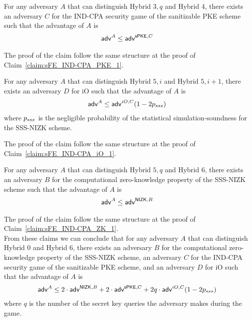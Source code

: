 \documentclass{llncs}
\begin{document}
\begin{claim} \label{claim:sFE_IND-CPA_PKE_2}
For any adversary $A$ that can distinguish Hybrid $3,q$ and Hybrid 4, there exists an adversary $C$ for the IND-CPA security game of the sanitizable PKE scheme such that the advantage of $A$ is
	\begin{align*}
	\mathsf{adv}^{A} \leq \mathsf{adv}^{\mathsf{sPKE},C}
	\end{align*}
\end{claim}

The proof of the claim follow the same structure at the proof of Claim~\ref{claim:sFE_IND-CPA_PKE_1}.

\begin{claim} \label{claim:sFE_IND-CPA_iO_2}
For any adversary $A$ that can distinguish Hybrid $5,i$ and Hybrid $5,i+1$, there exists an adversary $D$ for iO such that the advantage of $A$ is
	\begin{align*}
	\mathsf{adv}^{A} \leq \mathsf{adv}^{iO,C} (1 - 2p_{sss})
	\end{align*}
	where $p_{sss}$ is the negligible probability of the statistical simulation-soundness for the SSS-NIZK scheme. \\
\end{claim}

The proof of the claim follow the same structure at the proof of Claim~\ref{claim:sFE_IND-CPA_iO_1}.

\begin{claim} \label{claim:sFE_IND-CPA_ZK_2}
For any adversary $A$ that can distinguish Hybrid $5,q$ and Hybrid 6, there exists an adversary $B$ for the computational zero-knowledge property of the SSS-NIZK scheme such that the advantage of $A$ is
	\begin{align*}
	\mathsf{adv}^{A} \leq \mathsf{adv}^{\mathsf{NIZK},B}
	\end{align*}
\end{claim}

The proof of the claim follow the same structure at the proof of Claim~\ref{claim:sFE_IND-CPA_ZK_1}. \\

From these claims we can conclude that for any adversary $A$ that can distinguish Hybrid 0 and Hybrid 6, there exists an adversary $B$ for the computational zero-knowledge property of the SSS-NIZK scheme, an adversary $C$ for the IND-CPA security game of the sanitizable PKE scheme, and an adversary $D$ for iO such that the advantage of $A$ is
	\begin{align*}
	\mathsf{adv}^{A} \leq 2\cdot\mathsf{adv}^{\mathsf{NIZK},B} + 2\cdot\mathsf{adv}^{\mathsf{sPKE},C} + 2q\cdot\mathsf{adv}^{iO,C} (1 - 2p_{sss})
	\end{align*}
	where $q$ is the number of the secret key queries the adversary makes during the game.
\end{document}
